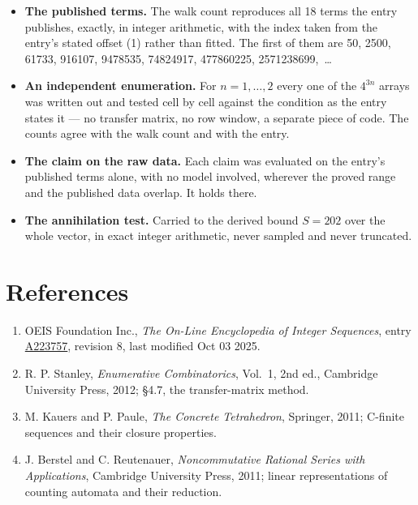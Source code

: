 \documentclass[11pt]{article}
\theoremstyle{definition}
\begin{document}
\begin{itemize}

\item {\bfseries The published terms.} The walk count reproduces all 18 terms the entry publishes, exactly, in integer arithmetic, with the index taken from the entry's stated offset (1) rather than fitted. The first of them are 50, 2500, 61733, 916107, 9478535, 74824917, 477860225, 2571238699,~\dots

\item {\bfseries An independent enumeration.} For $n = 1,\dots,2$ every one of the $4^{3n}$ arrays was written out and tested cell by cell against the condition as the entry states it --- no transfer matrix, no row window, a separate piece of code. The counts agree with the walk count and with the entry.

\item {\bfseries The claim on the raw data.} Each claim was evaluated on the entry's published terms alone, with no model involved, wherever the proved range and the published data overlap. It holds there.

\item {\bfseries The annihilation test.} Carried to the derived bound $S = 202$ over the whole vector, in exact integer arithmetic, never sampled and never truncated.

\end{itemize}

\section{References}

\begin{enumerate}

\item OEIS Foundation Inc., \emph{The On-Line Encyclopedia of Integer Sequences}, entry \href{https://oeis.org/A223757}{A223757}, revision 8, last modified Oct 03 2025.

\item R. P. Stanley, \emph{Enumerative Combinatorics}, Vol.~1, 2nd ed., Cambridge University Press, 2012; \S4.7, the transfer-matrix method.

\item M. Kauers and P. Paule, \emph{The Concrete Tetrahedron}, Springer, 2011; C-finite sequences and their closure properties.

\item J. Berstel and C. Reutenauer, \emph{Noncommutative Rational Series with Applications}, Cambridge University Press, 2011; linear representations of counting automata and their reduction.

\end{enumerate}
\end{document}
